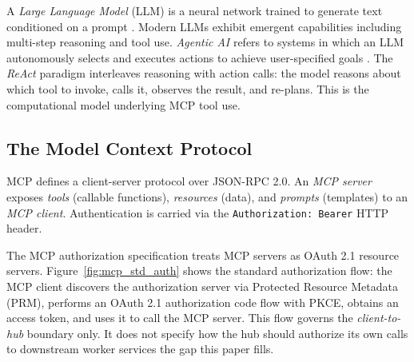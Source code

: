 \documentclass[journal]{IEEEtran}
\begin{document}
A \textit{Large Language Model} (LLM) is a neural network trained to generate
text conditioned on a prompt \cite{vaswani2017}. Modern LLMs exhibit emergent
capabilities including multi-step reasoning and tool use. \textit{Agentic AI}
refers to systems in which an LLM autonomously selects and executes actions to
achieve user-specified goals \cite{wang2024survey}. The \textit{ReAct} paradigm
\cite{yao2022react} interleaves reasoning with action calls: the model reasons
about which tool to invoke, calls it, observes the result, and re-plans. This
is the computational model underlying MCP tool use.

\subsection{The Model Context Protocol}

MCP \cite{mcp_spec} defines a client-server protocol over JSON-RPC 2.0. An
\textit{MCP server} exposes \textit{tools} (callable functions), \textit{resources}
(data), and \textit{prompts} (templates) to an \textit{MCP client}. Authentication
is carried via the \texttt{Authorization: Bearer} HTTP header.

The MCP authorization specification \cite{mcp_spec_2025} treats MCP servers as
OAuth 2.1 resource servers. Figure~\ref{fig:mcp_std_auth} shows the standard
authorization flow: the MCP client discovers the authorization server via
Protected Resource Metadata (PRM), performs an OAuth 2.1 authorization code flow
with PKCE, obtains an access token, and uses it to call the MCP server. This flow
governs the \textit{client-to-hub} boundary only. It does not specify how the hub
should authorize its own calls to downstream worker services the gap this paper
fills.
\end{document}
